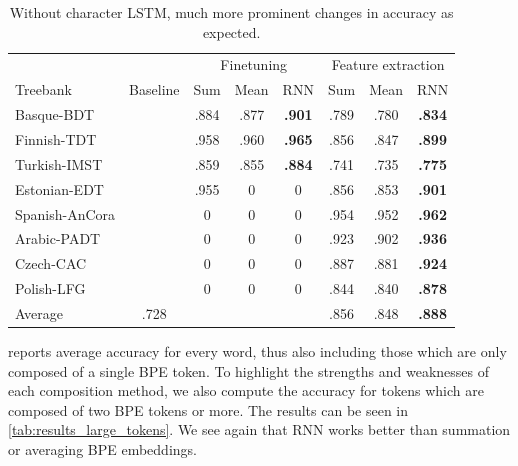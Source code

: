 \documentclass[11pt]{article}
\begin{document}
	\begin{table}%
	\centering
	\begin{tabular}{l|c|ccc|ccc}
		& & \multicolumn{3}{c}{Finetuning} & \multicolumn{3}{c}{Feature extraction} \\
		Treebank & Baseline & Sum & Mean & RNN & Sum & Mean & RNN \\
		\hline
		Basque-BDT      & & .884 & .877 & \textbf{.901} & .789 & .780 & \textbf{.834} \\
		Finnish-TDT     & & .958 & .960 & \textbf{.965} & .856 & .847 & \textbf{.899} \\
		Turkish-IMST    & & .859 & .855 & \textbf{.884} & .741 & .735 & \textbf{.775} \\
		Estonian-EDT    & & .955 & 0 & 0 & .856 & .853 & \textbf{.901} \\
		Spanish-AnCora  & & 0 & 0 & 0 & .954 & .952 & \textbf{.962} \\
		Arabic-PADT     & & 0 & 0 & 0 & .923 & .902 & \textbf{.936} \\
		Czech-CAC       & & 0 & 0 & 0 & .887 & .881 & \textbf{.924} \\
		Polish-LFG      & & 0 & 0 & 0 & .844 & .840 & \textbf{.878} \\
        \hline
        Average         & .728 &  &  &  & .856 & .848 & \textbf{.888} \\
	\end{tabular}
	\caption{\label{tab:results_tokens_nochars} Without character LSTM, much more prominent changes in accuracy as expected.}
    \end{table}

     reports average accuracy for every word,
    thus also including those which are only composed of a single BPE
    token. To highlight the strengths and weaknesses of each
    composition method, we also compute the accuracy for tokens which
    are composed of two BPE tokens or more. The results can be seen in
    \cref{tab:results_large_tokens}.  We see again that RNN works
    better than summation or averaging BPE embeddings.
\end{document}
